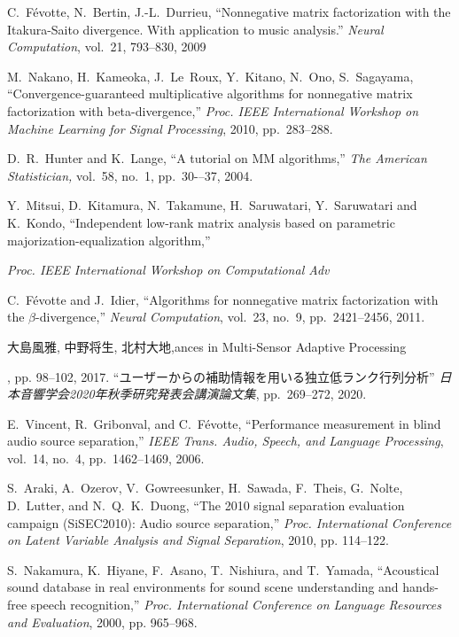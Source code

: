 \documentclass[honka]{nitkagawathesis}%
\begin{document}
\begin{thebibliography}{99}
  C.~Févotte, N.~Bertin, J.-L.~Durrieu, 
  ``Nonnegative matrix factorization with the Itakura-Saito divergence. With application to music analysis.'' 
  {\em Neural Computation}, vol.~21, 793--830, 2009
  
  M.~Nakano, H.~Kameoka, J.~Le~Roux, Y.~Kitano, N.~Ono, S.~Sagayama, ``Convergence-guaranteed multiplicative algorithms for nonnegative matrix factorization with beta-divergence,''
  {\em Proc. IEEE International Workshop on Machine Learning for Signal Processing}, 2010, pp.~283--288.
  
  D.~R.~Hunter and K.~Lange, ``A tutorial on MM algorithms,'' 
  {\em The American Statistician,} vol.~58, no.~1, pp.~30-–37, 2004.
  
  Y.~Mitsui, D.~Kitamura, N.~Takamune, H.~Saruwatari, Y.~Saruwatari and K.~Kondo, ``Independent low-rank matrix analysis based on parametric majorization-equalization algorithm,'' 
  {\em Proc. IEEE International Workshop on Computational Adv  

  C.~Févotte and J.~Idier, 
  ``Algorithms for nonnegative matrix factorization with the $\beta$-divergence,'' 
  {\em Neural Computation}, vol.~23, no.~9, pp.~2421--2456, 2011.

  大島風雅, 中野将生, 北村大地,ances in Multi-Sensor Adaptive Processing}, pp. 98--102, 2017.
``ユーザーからの補助情報を用いる独立低ランク行列分析''
  {\em 日本音響学会2020年秋季研究発表会講演論文集}, pp.~269--272, 2020.    

  E.~Vincent, R.~Gribonval, and C.~F\'evotte, ``Performance measurement in blind audio source separation,'' 
  {\em IEEE Trans. Audio, Speech, and Language Processing}, vol.~14, no.~4, pp.~1462--1469, 2006.
  
  S.~Araki, A.~Ozerov, V.~Gowreesunker, H.~Sawada, F.~Theis, G.~Nolte, D.~Lutter, and N.~Q.~K.~Duong, 
  ``The 2010 signal separation evaluation campaign (SiSEC2010): Audio source separation,'' 
  {\em Proc. International Conference on Latent Variable Analysis and Signal Separation}, 2010, pp. 114–122.
  
  S.~Nakamura, K.~Hiyane, F.~Asano, T.~Nishiura, and T.~Yamada, 
  ``Acoustical sound database in real environments for sound scene understanding and hands-free speech recognition,'' 
  {\em Proc. International Conference on Language Resources and Evaluation}, 2000, pp. 965–968.


\end{thebibliography}
\end{document}

